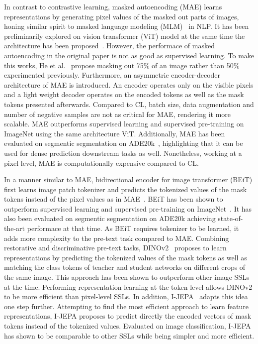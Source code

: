 \documentclass[a4paper,11pt,oneside]{report}
\begin{document}
In contrast to contrastive learning, masked autoencoding (MAE) learns representations by generating pixel values of the masked out parts of images, honing similar spirit to masked language modeling (MLM)~\cite{Devlin2019} in NLP. It has been preliminarily explored on vision transformer (ViT) model at the same time the architecture has been proposed~\cite{Dosovitskiy2020vit}. However, the performace of masked autoencoding in the original paper is not as good as supervised learning. To make this works, He et al.~\cite{He2022} propose masking out 75\% of an image rather than 50\% experimented previously. Furthermore, an asymmetric encoder-decoder architecture of MAE is introduced. An encoder operates only on the visible pixels and a light weight decoder operates on the encoded tokens as well as the mask tokens presented afterwards. Compared to CL, batch size, data augmentation and number of negative samples are not as critical for MAE, rendering it more scalable. MAE outperforms supervised learning and supervised pre-training on ImageNet using the same architecture ViT. Additionally, MAE has been evaluated on segmentic segmentation on ADE20k~\cite{Zhou2018}, highlighting that it can be used for dense prediction downstream tasks as well. Nonetheless, working at a pixel level, MAE is computationally expensive compared to CL.

In a manner similar to MAE, bidirectional encoder for image transformer (BEiT) first learns image patch tokenizer and predicts the tokenized values of the mask tokens instead of the pixel values as in MAE~\cite{Bao2022beit}. BEiT has been shown to outperform supervised learning and supervised pre-training on ImageNet~\cite{Russakovsky2015}. It has also been evaluated on segmentic segmentation on ADE20k achieving state-of-the-art performace at that time. As BEiT requires tokenizer to be learned, it adds more complexity to the pre-text task compared to MAE. Combining restorative and discriminative pre-text tasks, DINOv2~\cite{Oquab2024dinov} proposes to learn representations by predicting the tokenized values of the mask tokens as well as matching the class tokens of teacher and student networks on different crops of the same image. This approach has been shown to outperform other image SSLs at the time. Performing representation learning at the token level allows DINOv2 to be more efficient than pixel-level SSLs. In addition, I-JEPA~\cite{Assran2023} adapts this idea one step further. Attempting to find the most efficient approach to learn feature representations, I-JEPA proposes to predict directly the encoded vectors of mask tokens instead of the tokenized values. Evaluated on image classification, I-JEPA has shown to be comparable to other SSLs while being simpler and more efficient. 
\end{document}
